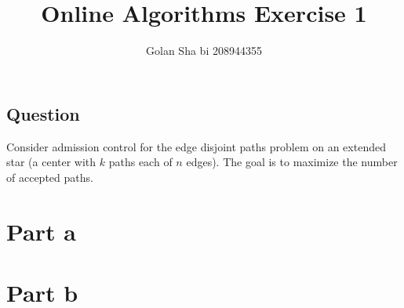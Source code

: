\documentclass{article}
\title{Online Algorithms Exercise 1}
\author{Golan Sha       bi 208944355}
\begin{document}
\maketitle
\subsection*{Question}
Consider admission control for the edge disjoint paths problem on an extended star (a center with $k$ paths each of $n$ edges). The goal is to maximize the number of accepted paths.

\section*{Part a}

\pagebreak

\section*{Part b}

\pagebreak
\end{document}
